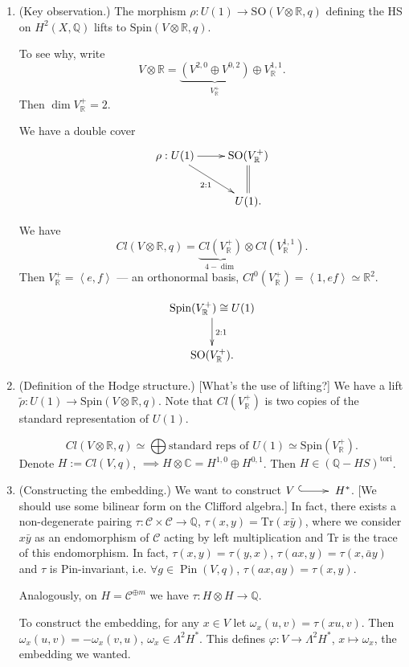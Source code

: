 \begin{enumerate}
\item (Key observation.)
The morphism $\rho:U(1) \to
\text{SO}(V\otimes \mathbb{R},q)$
defining the HS on $H^2(X,\mathbb{Q})$
lifts to $\text{Spin}(V\otimes
\mathbb{R},q)$.

To see why, write
$$
V \otimes \mathbb{R}=
\underbrace{(V^{2,0}\oplus
V^{0,2})}_{V^+_{\mathbb{R}}}
\oplus V^{1,1}_\mathbb{R}.
$$
Then $\dim V^+_\mathbb{R}=2$.

We have a double cover
$$
\xymatrix{
\rho:U(1)\ar[rd]_{2:1}\ar[r]&
\text{SO}(V_{\mathbb{R}}^+)\ar@{=}[d]\\
& U(1).
}
$$

We have
$$
Cl(V \otimes \mathbb{R},q)
= \underbrace{ Cl(V_\mathbb{R}^+)}_{4-\dim}
\otimes Cl(V^{1,1}_\mathbb{R}).
$$
Then $V_\mathbb{R}^+=\left\langle{}e,f\right\rangle{}$ --- an
orthonormal basis,
$Cl^0(V_\mathbb{R}^+)=\left\langle{}1,ef\right\rangle{}\simeq
\mathbb{R}^2$.

$$
\xymatrix{
\text{Spin}(V_\mathbb{R}^+)\cong U(1)
\ar[d]^{2:1}\\
\text{SO}(V_\mathbb{R}^+).
}
$$

\item (Definition of the Hodge structure.)
[What's the use of lifting?]
We have a lift $\tilde{\rho}:U(1) \to
\text{Spin}(V\otimes \mathbb{R},q)$.
Note that $Cl(V_\mathbb{R}^+)$ is two copies
of the standard
representation of $U(1)$.

$$
Cl(V \otimes \mathbb{R},q)
\simeq
\bigoplus \text{standard reps of }U(1) \simeq
\text{Spin}(V_\mathbb{R}^+).
$$
Denote $H:=Cl(V,q)$,
$\implies H \otimes \mathbb{C}=H^{1,0} \oplus
H^{0,1}$.
Then $H \in (\mathbb{Q}-HS)^{\text{tori}}$.

\item (Constructing the embedding.)
We want to construct $V
\xymatrix{\ar@{^{(}->}[r]&} H^*$.
[We should use some bilinear form on the
Clifford algebra.]
In fact, there exists a non-degenerate
pairing
$\tau:\mathcal{C} \times \mathcal{C} \to
\mathbb{Q}$,
$\tau(x,y)=\text{Tr}(x\bar{y})$,
where we consider $x\bar{y}$ as an
endomorphism of $\mathcal{C}$
acting by left multiplication and
Tr is the trace of this endomorphism.
In fact, $\tau(x,y)=\tau(y,x)$,
$\tau(ax,y)=\tau(x,\bar{a}y)$ and
$\tau$ is Pin-invariant, i.e.
$\forall g \in \operatorname{Pin}(V,q)$,
$\tau(ax,ay)=\tau(x,y)$.

Analogously, on $H=\mathcal{C}^{\oplus m}$
we have $\tau:H \otimes H \to \mathbb{Q}$.

To construct the embedding, for any $x \in V$
let $\omega_x(u,v)=\tau(xu,v)$.
Then $\omega_x(u,v)=-\omega_x(v,u)$,
$\omega_x \in \Lambda^2H^*$.
This defines $\varphi:V \to \Lambda^2H^*$,
$x \mapsto \omega_x$, the embedding we
wanted.


\end{enumerate}
